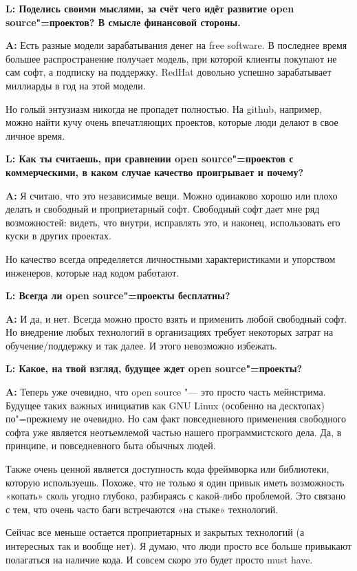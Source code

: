 \documentclass[10pt, a5paper]{article}
\begin{document}
{\noindent \bf L: Поделись своими мыслями, за счёт чего идёт развитие open source"=проектов? В смысле финансовой стороны.}

{\noindent \bf A:} Есть разные модели зарабатывания денег на free software. В последнее время большее распространение получает модель, при которой клиенты покупают не сам софт, а подписку на поддержку. RedHat довольно успешно зарабатывает миллиарды в год на этой модели.

Но голый энтузиазм никогда не пропадет полностью. На github, например, можно найти кучу очень впечатляющих проектов, которые люди делают в свое личное время.


{\noindent \bf L:  Как ты считаешь, при сравнении open source"=проектов с коммерческими, в каком случае качество проигрывает и почему?}

{\noindent \bf A:} Я считаю, что это независимые вещи. Можно одинаково хорошо или плохо делать и свободный и проприетарный софт. Свободный софт дает мне ряд возможностей: видеть, что внутри, исправлять это, и наконец, использовать его куски в других проектах. 

Но качество всегда определяется личностными характеристиками и упорством инженеров, которые над кодом работают.

{\noindent \bf L:  Всегда ли open source"=проекты бесплатны?}

{\noindent \bf A:} И да, и нет. Всегда можно просто взять и применить любой свободный софт. Но внедрение любых технологий в организациях требует некоторых затрат на обучение/поддержку и так далее. И этого невозможно избежать.


{\noindent \bf L:  Какое, на твой взгляд, будущее ждет open source"=проекты?}

{\noindent \bf A:} Теперь уже очевидно, что open source "--- это просто часть мейнстрима. Будущее таких важных инициатив как GNU Linux (особенно на десктопах) по"=прежнему не очевидно. Но сам факт повседневного применения свободного софта уже является неотъемлемой частью нашего программистского дела. Да, в принципе, и повседневного быта обычных людей.

Также очень ценной является доступность кода фреймворка или библиотеки, которую используешь. Похоже, что не только я один привык иметь возможность «копать» сколь угодно глубоко, разбираясь с какой-либо проблемой. Это связано с тем, что очень часто баги встречаются «на стыке» технологий.

Сейчас все меньше остается проприетарных и закрытых технологий (а интересных так и вообще нет). Я думаю, что люди просто все больше привыкают полагаться на наличие кода. И совсем скоро это будет просто must have.
\end{document}
